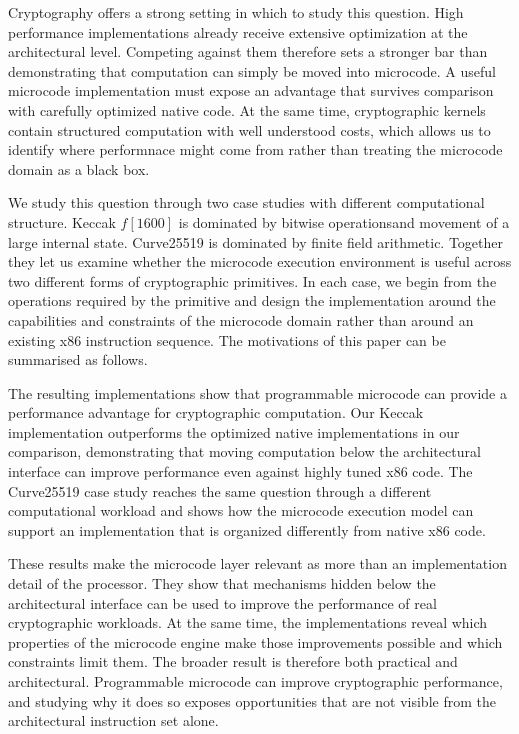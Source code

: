 \documentclass[journal=tches,submission]{iacrtrans}
\begin{document}
Cryptography offers a strong setting in which to study this question.
High performance implementations already receive extensive optimization at the architectural level. 
Competing against them therefore sets a stronger bar than demonstrating that computation can simply be moved into microcode. 
A useful microcode implementation must expose an advantage that survives comparison with carefully optimized native code. 
At the same time, cryptographic kernels contain structured computation with well understood costs, which allows us to identify where performnace might come from rather than treating the microcode domain as a black box.

We study this question through two case studies with different computational structure. 
Keccak $f[1600]$ is dominated by bitwise operationsand movement of a large internal state. 
Curve25519 is dominated by finite field arithmetic. 
Together they let us examine whether the microcode execution environment is useful across two different forms of cryptographic primitives. 
In each case, we begin from the operations required by the primitive and design the implementation around the capabilities and constraints of the microcode domain rather than around an existing x86 instruction sequence.
The motivations of this paper can be summarised as follows.

The resulting implementations show that programmable microcode can provide a performance advantage for cryptographic computation. 
Our Keccak implementation outperforms the optimized native implementations in our comparison, demonstrating that moving computation below the architectural interface can improve performance even against highly tuned x86 code. 
The Curve25519 case study reaches the same question through a different computational workload and shows how the microcode execution model can support an implementation that is organized differently from native x86 code. 

These results make the microcode layer relevant as more than an implementation detail of the processor. 
They show that mechanisms hidden below the architectural interface can be used to improve the performance of real cryptographic workloads. 
At the same time, the implementations reveal which properties of the microcode engine make those improvements possible and which constraints limit them. 
The broader result is therefore both practical and architectural. 
Programmable microcode can improve cryptographic performance, and studying why it does so exposes opportunities that are not visible from the architectural instruction set alone.
\end{document}
